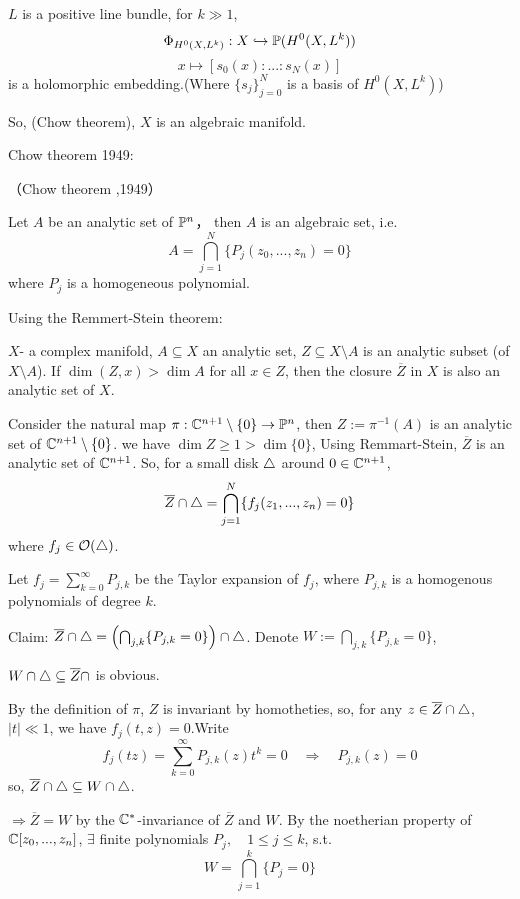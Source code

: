 \begin{thm} $L$ is a positive line bundle, for $k\gg 1$,
$$
  \Phi_{H^0(X,L^k)}:
  X\hookrightarrow\mathbb{P}(H^0(X,L^k))
$$
$$
  x\mapsto[s_0(x):...:s_N(x)]
$$
is a holomorphic embedding.(Where $\{s_j\}_{j=0}^N$
is a basis of $H^0(X,L^k)$)

So, (Chow theorem), $X$ is an algebraic manifold.
\end{thm}

Chow theorem 1949:

\begin{thm}（Chow theorem ,1949）

Let $A$ be an analytic set of $\mathbb{P}^n$，
then $A$ is an algebraic set, i.e.
$$
  A=\bigcap_{j=1}^N
  \{P_j(z_0,...,z_n)=0\}
$$
where $P_j$ is a homogeneous polynomial.
\end{thm}

Using the Remmert-Stein theorem:

$X$- a complex manifold, $A\subseteq X$ an analytic set,
$Z\subseteq X\setminus A$ is an analytic subset (of $X\setminus A$).
If $\dim(Z,x)>\dim A$ for all $x\in Z$,
then the closure $\overline{Z}$ in $X$ is also an analytic set of $X$.

Consider the natural map $\pi:\mathbb{C}^{n+1}\setminus\{0\}\to\mathbb{P}^n$,
then $Z:=\pi^{-1}(A)$ is an analytic set of $\mathbb{C}^{n+1}\setminus\{0\}$.
we have $\dim Z\geq 1>\dim\{0\}$,
Using Remmart-Stein, $\overline{Z}$ is an analytic set of $\mathbb{C}^{n+1}$.
So, for a small disk $\triangle$ around $0\in\mathbb{C}^{n+1}$,
$$\overline{Z}\cap\triangle
=\bigcap_{j=1}^N
\{f_j(z_1,...,z_n)=0\}
$$
where $f_j\in\mathcal{O}(\triangle)$.

Let $f_j=\sum\limits_{k=0}^\infty P_{j,k}$ be the Taylor expansion
of $f_j$, where $P_{j,k}$ is a homogenous polynomials of degree $k$.

Claim: $\overline{Z}\cap\triangle=
\left(
  \bigcap_{j,k}\{P_{j,k}=0\}
\right)\cap\triangle$.
Denote $W:=\bigcap_{j,k}\{P_{j,k}=0\}$,

$W\cap\triangle\subseteq\overline{Z}\cap$ is obvious.

By the definition of $\pi$, $Z$ is invariant by homotheties,
so, for any $z\in\overline{Z}\cap\triangle$, $|t|\ll 1$,
we have $f_j(t,z)=0$.Write
$$
  f_j(tz)
=
  \sum_{k=0}^{\infty}
    P_{j,k}(z)t^k
=0\quad
\Rightarrow
\quad
P_{j,k}(z)=0
$$
so, $\overline{Z}\cap\triangle\subseteq W\cap\triangle$.

$\Rightarrow\overline{Z}=W$ by the $\mathbb{C}^*$-invariance of $\overline{Z}$ and $W$.
By the noetherian property of $\mathbb{C}[z_0,...,z_n]$, $\exists$
finite polynomials $P_j,\quad 1\leq j\leq k$, s.t.
$$
  W=\bigcap_{j=1}^k
  \{P_j=0\}
$$

